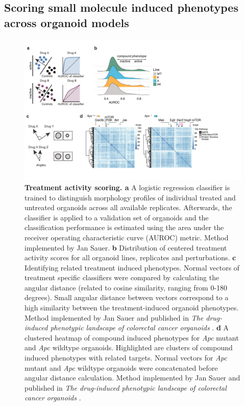 \begin{flushleft}
\clearpage
\subsection{Scoring small molecule induced phenotypes across organoid models}

\begin{figure}[h!]
\centering
\includegraphics[width=\textwidth,
                height=\textheight,
                keepaspectratio]{figures/adenomaprofiling/pdf/fig_1_5_2.pdf}
\caption[Treatment activity scoring]{\textbf{Treatment activity scoring. a} A logistic regression classifier is trained to distinguish morphology profiles of individual treated and untreated organoids across all available replicates. Afterwards, the classifier is applied to a validation set of organoids and the classification performance is estimated using the area under the receiver operating characteristic curve (AUROC) metric. Method implemented by Jan Sauer.
\textbf{b} Distribution of centered treatment activity scores for all organoid lines, replicates and perturbations. 
\textbf{c} Identifying related treatment induced phenotypes. Normal vectors of treatment specific classifiers were compared by calculating the angular distance (related to cosine similarity, ranging from 0-180 degrees). Small angular distance between vectors correspond to a high similarity between the treatment-induced organoid phenotypes. Method implemented by Jan Sauer and published in \textit{The drug-induced phenotypic landscape of colorectal cancer organoids} \parencite{betgeDruginducedPhenotypicLandscape2022}.
\textbf{d} A clustered heatmap of compound induced phenotypes for \textit{Apc} mutant and \textit{Apc} wildtype organoids. Highlighted are clusters of compound induced phenotypes with related targets. Normal vectors for \textit{Apc} mutant and \textit{Apc} wildtype organoids were concatenated before angular distance calculation. Method implemented by Jan Sauer and published in \textit{The drug-induced phenotypic landscape of colorectal cancer organoids} \parencite{betgeDruginducedPhenotypicLandscape2022}.
}
\label{fig_150}
\end{figure}
\bigbreak


\end{flushleft}
